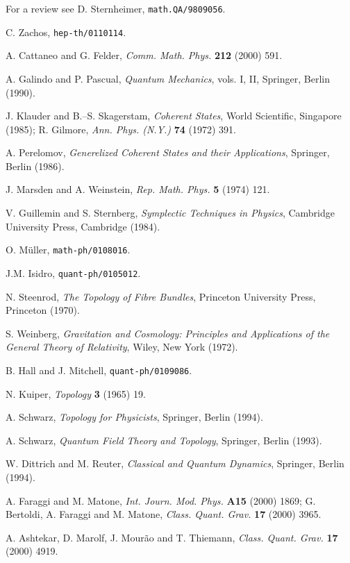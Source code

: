 \documentclass[a4paper,a4paper]{article}
\begin{document}
\begin{thebibliography}{99}
For a review see D. Sternheimer, {\tt math.QA/9809056}.

C. Zachos, {\tt hep-th/0110114}.

A. Cattaneo and G. Felder, 
{\it Comm. Math. Phys.} {\bf 212} (2000) 591.

A. Galindo and P. Pascual, {\it Quantum Mechanics}, vols. I, II, Springer, Berlin (1990).

J. Klauder and B.--S. Skagerstam, {\it Coherent States}, World Scientific, Singapore (1985);
R. Gilmore, {\it Ann. Phys. (N.Y.)} {\bf 74} (1972) 391.

A. Perelomov, {\it Generelized Coherent States and their Applications}, Springer, Berlin (1986). 

J. Marsden and A. Weinstein, {\it Rep. Math. Phys.} {\bf 5} (1974) 121.

V. Guillemin and S. Sternberg, {\it Symplectic Techniques in Physics}, 
Cambridge University Press, Cambridge (1984).

O. M\"uller, {\tt math-ph/0108016}.

J.M. Isidro, {\tt quant-ph/0105012}.

N. Steenrod, {\it The Topology of Fibre Bundles}, Princeton University 
Press, Princeton (1970).

S. Weinberg, {\it Gravitation and Cosmology: Principles and Applications of 
the General Theory of Relativity}, Wiley, New York (1972).

B. Hall and J. Mitchell, {\tt quant-ph/0109086}.

N. Kuiper, {\it Topology} {\bf 3} (1965) 19.

A. Schwarz, {\it Topology for Physicists}, Springer, Berlin (1994).

A. Schwarz, {\it Quantum Field Theory and Topology}, Springer, Berlin (1993).

W. Dittrich and M. Reuter, {\it Classical and Quantum Dynamics}, Springer, 
Berlin (1994).

A. Faraggi and M. Matone, {\it Int. Journ. Mod. Phys.} {\bf A15} (2000) 1869;
G. Bertoldi, A. Faraggi and M. Matone, {\it Class. Quant. Grav.} {\bf 17} (2000) 3965.

A. Ashtekar, D. Marolf, J. Mour\~ao and T. Thiemann, {\it Class. Quant. 
Grav.} {\bf 17} (2000) 4919.


\end{thebibliography}
\end{document}
